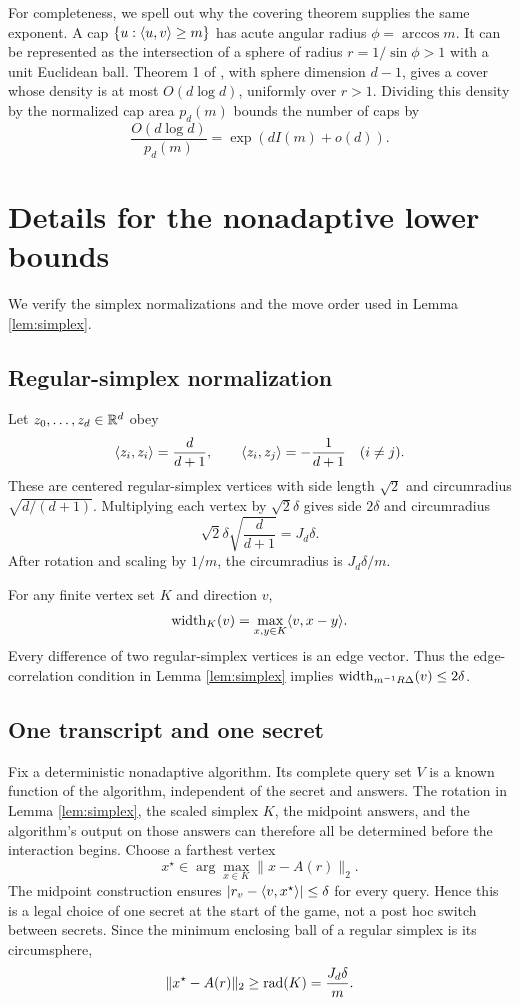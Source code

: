 For completeness, we spell out why the covering theorem supplies the same
exponent.  A cap $\{u:\langle u,v\rangle\geq m\}$ has acute angular radius
$\phi=\arccos m$.  It can be represented as the intersection of a sphere of
radius $r=1/\sin\phi>1$ with a unit Euclidean ball.  Theorem 1 of
\citet{dumer2007covering}, with sphere dimension $d-1$, gives a cover whose
density is at most $O(d\log d)$, uniformly over $r>1$.  Dividing this density
by the normalized cap area $p_d(m)$ bounds the number of caps by
\[
 \frac{O(d\log d)}{p_d(m)}=\exp(dI(m)+o(d)).
\]

\section{Details for the nonadaptive lower bounds}                 \label{app:lower}

We verify the simplex normalizations and the move order used in Lemma
\ref{lem:simplex}.

\subsection{Regular-simplex normalization}

Let $z_0,\ldots,z_d\in\mathbb{R}^d$ obey
\[
 \langle z_i,z_i\rangle=\frac{d}{d+1},\qquad
 \langle z_i,z_j\rangle=-\frac1{d+1}\quad(i\neq j).
\]
These are centered regular-simplex vertices with side length $\sqrt2$ and
circumradius $\sqrt{d/(d+1)}$.  Multiplying each vertex by $\sqrt2\delta$
gives side $2\delta$ and circumradius
\[
 \sqrt2\delta\sqrt{\frac d{d+1}}=J_d\delta.
\]
After rotation and scaling by $1/m$, the circumradius is $J_d\delta/m$.

For any finite vertex set $K$ and direction $v$,
\[
 \operatorname{width}_K(v)=\max_{x,y\in K}\langle v,x-y\rangle.
\]
Every difference of two regular-simplex vertices is an edge vector.  Thus the
edge-correlation condition in Lemma \ref{lem:simplex} implies
$\operatorname{width}_{m^{-1}R\Delta}(v)\leq2\delta$.

\subsection{One transcript and one secret}

Fix a deterministic nonadaptive algorithm.  Its complete query set $V$ is a
known function of the algorithm, independent of the secret and answers.  The
rotation in Lemma \ref{lem:simplex}, the scaled simplex $K$, the midpoint
answers, and the algorithm's output on those answers can therefore all be
determined before the interaction begins.  Choose a farthest vertex
\[
 x^\star\in\arg\max_{x\in K}\|x-A(r)\|_2.
\]
The midpoint construction ensures
$|r_v-\langle v,x^\star\rangle|\leq\delta$ for every query.  Hence this is a legal
choice of one secret at the start of the game, not a post hoc switch between
secrets.  Since the minimum enclosing ball of a regular simplex is its
circumsphere,
\[
 \|x^\star-A(r)\|_2\geq\operatorname{rad}(K)=\frac{J_d\delta}{m}.
\]

